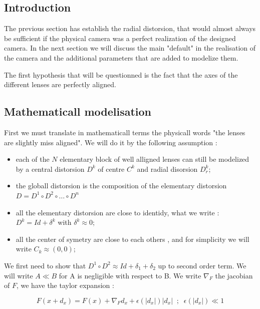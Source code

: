 \subsection{Introduction}
The previous section has establish the radial distorsion, that would almost always
be sufficient if the physical camera was a perfect realization of the designed camera.
In the next section we will discuss the main "default" in the realisation of
the camera and the additional parameters that are added to modelize them.

The first hypothesis  that will be questionned is the fact that the axes of the different
lenses are perfectly aligned.

\subsection{Mathematicall modelisation}

First we must translate in mathematicall terms the physicall words
"the lenses are slightly miss aligned".
We will do it by  the following assumption :

\begin{itemize}
    \item  each of the $N$ elementary block of well alligned lenses can still be 
           modelized by a central distorsion $D^k$ of centre $C^k$ and radial
           disorsion $D^k_r$;

    \item  the globall distorsion is the composition of the elementary distorsion
           $ D = D^1 \circ D^2 \circ \dots \circ D^n$

    \item  all the elementary distorsion are close to identidy, what we write :
           $D^k = Id + \delta^k$  with $\delta^k \approx 0$;

    \item  all the center of symetry are close to each others , and for simplicity
           we will write $C_k \approx (0,0)$;
\end{itemize}


We first need to show that $D^1 \circ D^2  \approx Id + \delta_1 + \delta_2$ up to second order term.
We will write $A\ll B$ for A is negligible with respect to B. We write $\nabla_F$
the jacobian of $F$, we have the taylor expansion :

\begin{equation}
	F(x+d_x) = F(x) + \nabla_F d_x + \epsilon(|d_x|) |d_x|  \;\; ; \;\;  \epsilon(|d_x|) \ll 1
\end{equation}



